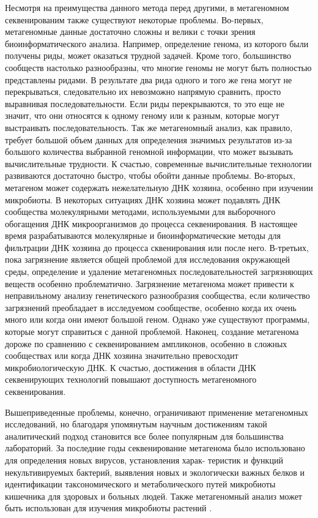 Несмотря на преимущества данного метода перед другими, в метагеномном секвенированим также существуют некоторые проблемы. Во-первых, метагеномные данные достаточно
сложны и велики с точки зрения биоинформатического анализа. Например, определение генома, из которого были получены риды, может оказаться трудной задачей. Кроме того, большинство сообществ настолько разнообразны, что многие геномы не могут быть полностью
представлены ридами. В результате два рида одного и того же гена могут не перекрываться,
следовательно их невозможно напрямую сравнить, просто выравнивая последовательности.
Если риды перекрываются, то это еще не значит, что они относятся к одному геному или к
разным, которые могут выстраивать последовательность. Так же метагеномный анализ, как
правило, требует большой объем данных для определения значимых результатов из-за большого количества выбранной геномной информации, что может вызывать вычислительные
трудности. К счастью, современные вычислительные технологии развиваются достаточно
быстро, чтобы обойти данные проблемы. Во-вторых, метагеном может содержать нежелательную ДНК хозяина, особенно при изучении микробиоты. В некоторых ситуациях ДНК
хозяина может подавлять ДНК сообщества молекулярными методами, используемыми для
выборочного обогащения ДНК микроорганизмов до процесса секвенирования. В настоящее
время разрабатываются молекулярные и биоинформатические методы для фильтрации ДНК
хозяина до процесса сквенирования или после него. В-третьих, пока загрязнение является
общей проблемой для исследования окружающей среды, определение и удаление метагеномных последовательностей загрязняющих веществ особенно проблематично. Загрязнение метагенома может привести к неправильному анализу генетического разнообразия сообщества,
если количество загрязнений преобладает в исследуемом сообществе, особенно когда их очень
много или когда они имеют большой геном. Однако уже существуют программы, которые
могут справиться с данной проблемой. Наконец, создание метагенома дороже по сравнению
с секвенированием ампликонов, особенно в сложных сообществах или когда ДНК хозяина
значительно превосходит микробиологическую ДНК. К счастью, достижения в области ДНК
секвенирующих технологий повышают доступность метагеномного секвенирования.

Вышеприведенные проблемы, конечно, ограничивают применение метагеномных исследований, но благодаря упомянутым научным достижениям такой аналитический подход становится все более популярным для большинства лабораторий. За последние годы секвенирование метагенома было использовано для определения новых вирусов, установления харак-
теристик и функций некультивируемых бактерий, выявления новых и экологически важных
белков и идентификации таксономического и метаболического путей микробиоты кишечника
для здоровых и больных людей. Также метагеномный анализ может быть использован для
изучения микробиоты растений \cite{Sharpton2014}.

